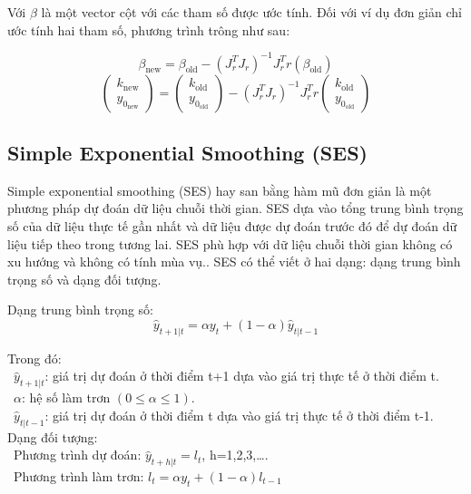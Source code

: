 \documentclass[conference]{IEEEtran}
\begin{document}
Với \(\beta\) là một vector cột với các tham số được ước tính. Đối với ví dụ đơn giản chỉ ước tính hai tham số, phương trình trông như sau:

\begin{center}
    \[
        \beta_{\text{new}} = \beta_{\text{old}} - (J^T_r J_r)^{-1} J^T_r r(\beta_{\text{old}})
    \]
    \[
        \begin{pmatrix}
            k_{\text{new}} \\ y_{0_\text{new}}
        \end{pmatrix} =
        \begin{pmatrix}
            k_{\text{old}} \\ y_{0_\text{old}}
        \end{pmatrix} - (J^T_r J_r)^{-1} J^T_r r \begin{pmatrix}
            k_{\text{old}} \\ y_{0_\text{old}}
        \end{pmatrix}
    \]
\end{center}
\vspace{1mm}


\subsection{Simple Exponential Smoothing (SES)}
Simple exponential smoothing (SES) hay san bằng hàm mũ đơn giản là một phương pháp dự đoán dữ liệu chuỗi thời gian. SES dựa vào tổng trung bình trọng số của dữ liệu thực tế gần nhất và dữ liệu được dự đoán trước đó để dự đoán dữ liệu tiếp theo trong tương lai. SES phù hợp với dữ liệu chuỗi thời gian không có xu hướng và không có tính mùa vụ.. SES có thể viết ở hai dạng: dạng trung bình trọng số và dạng đối tượng.

Dạng trung bình trọng số:
\[\hat{y}_{t+1|t} = \alpha y_t + (1-\alpha)\hat{y}_{t|t-1}\]

Trong đó:\\
\indent\textbullet\ \(\hat{y}_{t+1|t} \): giá trị dự đoán ở thời điểm t+1 dựa vào giá trị thực tế ở thời điểm t.\\
\indent\textbullet\ \(\alpha\): hệ số làm trơn \((0\le\alpha\le1)\).\\
\indent\textbullet\ \(\hat{y}_{t|t-1} \): giá trị dự đoán ở thời điểm t dựa vào giá trị thực tế ở thời điểm  t-1.\\

Dạng đối tượng:\\
\indent\textbullet\ Phương trình dự đoán: \(\hat{y}_{t+h|t}=l_t\), h=1,2,3,\dots.\\
\indent\textbullet\ Phương trình làm trơn: \(l_t=\alpha y_t+(1-\alpha)l_{t-1}\)\\
\end{document}
